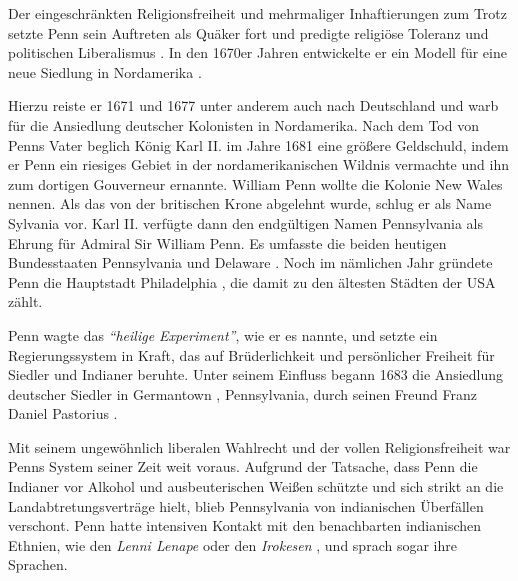 \medskip

Der eingeschränkten Religionsfreiheit und mehrmaliger Inhaftierungen zum Trotz
setzte Penn sein Auftreten als Quäker fort und predigte 
religiöse Toleranz  und politischen Liberalismus
. In den 1670er Jahren entwickelte er ein Modell
für eine neue Siedlung in Nordamerika .

\medskip

Hierzu reiste er 1671 und 1677 unter anderem auch nach Deutschland
 und warb für die Ansiedlung  deutscher
Kolonisten  in Nordamerika. Nach dem Tod von Penns
Vater beglich König Karl II. im Jahre 1681 eine
größere Geldschuld, indem er Penn ein riesiges Gebiet in der nordamerikanischen
Wildnis vermachte und ihn zum dortigen Gouverneur ernannte. William Penn wollte
die Kolonie New Wales nennen. Als das von der britischen Krone abgelehnt wurde,
schlug er als Name Sylvania vor. Karl II. verfügte dann den endgültigen Namen
Pennsylvania  als Ehrung für Admiral Sir
 William Penn. Es umfasste die beiden
heutigen Bundesstaaten Pennsylvania und Delaware . Noch im
nämlichen Jahr gründete Penn die Hauptstadt Philadelphia
, die damit zu den ältesten Städten der USA
 zählt.

\medskip

Penn wagte das \textit{"`heilige Experiment"'}, wie er es nannte, und setzte ein
Regierungssystem  in Kraft, das auf Brüderlichkeit und
persönlicher Freiheit für Siedler und Indianer 
beruhte. Unter seinem Einfluss begann 1683 die Ansiedlung deutscher
Siedler in Germantown
, Pennsylvania, durch seinen Freund Franz Daniel
Pastorius .

\medskip

Mit seinem ungewöhnlich liberalen Wahlrecht  und der vollen
Religionsfreiheit  war Penns System seiner Zeit weit
voraus. Aufgrund der Tatsache, dass Penn die Indianer vor Alkohol
 und ausbeuterischen Weißen  schützte und sich
strikt an die Landabtretungsverträge  hielt, blieb
Pennsylvania von indianischen Überfällen verschont. Penn hatte intensiven
Kontakt mit den benachbarten indianischen Ethnien, wie den \textit{Lenni Lenape}
 oder den \textit{Irokesen}
, und sprach sogar ihre Sprachen.

